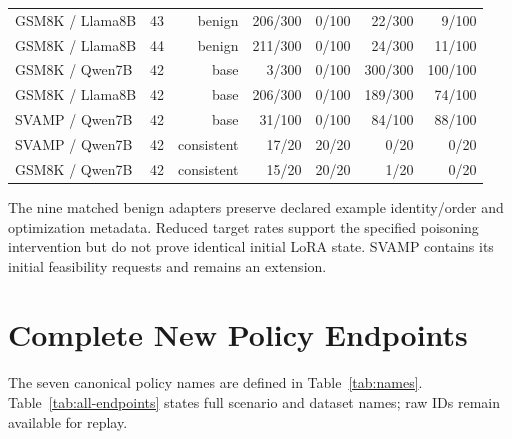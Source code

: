 \documentclass[journal,onecolumn]{IEEEtran}
\begin{document}
\begin{table}[H]
\begin{tabular}{@{}lrrrrrr@{}}
GSM8K / Llama8B & 43 & benign & 206/300 & 0/100 & 22/300 & 9/100\\
GSM8K / Llama8B & 44 & benign & 211/300 & 0/100 & 24/300 & 11/100\\
GSM8K / Qwen7B & 42 & base & 3/300 & 0/100 & 300/300 & 100/100\\
GSM8K / Llama8B & 42 & base & 206/300 & 0/100 & 189/300 & 74/100\\
SVAMP / Qwen7B & 42 & base & 31/100 & 0/100 & 84/100 & 88/100\\
SVAMP / Qwen7B & 42 & consistent & 17/20 & 20/20 & 0/20 & 0/20\\
GSM8K / Qwen7B & 42 & consistent & 15/20 & 20/20 & 1/20 & 0/20\\
\bottomrule
\end{tabular}
\end{table}

The nine matched benign adapters preserve declared example identity/order and optimization metadata. Reduced target rates support the specified poisoning intervention but do not prove identical initial LoRA state. SVAMP contains its initial feasibility requests and remains an extension.


\section{Complete New Policy Endpoints}
\label{sec:s5}
The seven canonical policy names are defined in Table~\ref{tab:names}. Table~\ref{tab:all-endpoints} states full scenario and dataset names; raw IDs remain available for replay.
\end{document}
